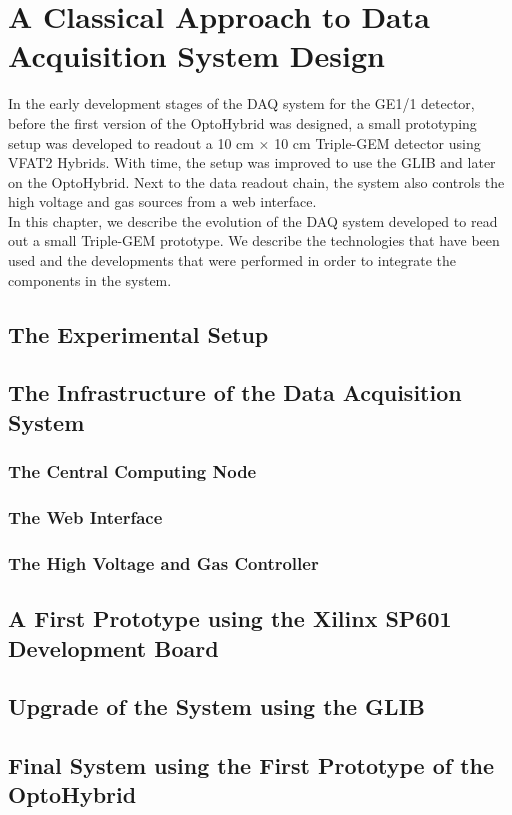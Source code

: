 \chapter{A Classical Approach to Data Acquisition System Design}
\label{chap:III-1-arch}

  In the early development stages of the DAQ system for the GE1/1 detector, before the first version of the OptoHybrid was designed, a small prototyping setup was developed to readout a 10 cm $ \times $ 10 cm Triple-GEM detector using VFAT2 Hybrids. With time, the setup was improved to use the GLIB and later on the OptoHybrid. Next to the data readout chain, the system also controls the high voltage and gas sources from a web interface. \\

  In this chapter, we describe the evolution of the DAQ system developed to read out a small Triple-GEM prototype. We describe the technologies that have been used and the developments that were performed in order to integrate the components in the system.

  \section{The Experimental Setup}

  \section{The Infrastructure of the Data Acquisition System}

    \subsection{The Central Computing Node}

    \subsection{The Web Interface}

    \subsection{The High Voltage and Gas Controller}

  \section{A First Prototype using the Xilinx SP601 Development Board}

  \section{Upgrade of the System using the GLIB}

  \section{Final System using the First Prototype of the OptoHybrid}

